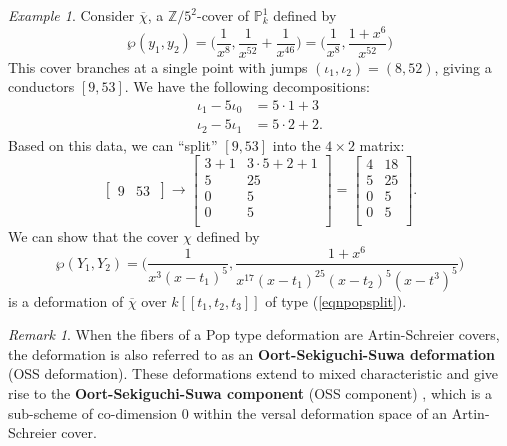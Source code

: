 \documentclass{compositio}
\theoremstyle{remark}
\newtheorem{example}[theorem]{Example}
\theoremstyle{remark}
\newtheorem{remark}[theorem]{Remark}
\begin{document}
\begin{example}
\label{examplepopdeformation}
Consider $\overline{\chi}$, a $\mathbb{Z}/5^2$-cover of $\mathbb{P}^1_k$ defined by
\[ \wp(y_1,y_2)=\bigg( \frac{1}{x^8}, \frac{1}{x^{52}}+\frac{1}{x^{46}} \bigg)=\bigg( \frac{1}{x^8}, \frac{1+x^6}{x^{52}}\bigg) \]
This cover branches at a single point with jumps $(\iota_1, \iota_2)=(8, 52)$, giving a conductors $[9,53]$. We have the following decompositions:
\begin{equation}
\begin{split}
\iota_1-5\iota_0 & = 5 \cdot 1 + 3 \\
\iota_2-5\iota_1 & = 5 \cdot 2+2.
\end{split}
\end{equation}
Based on this data, we can ``split'' $[9,53]$ into the $4 \times 2$ matrix:
\begin{equation}
\label{eqnpopsplit}
\begin{bmatrix}
9 & 53 \
\end{bmatrix} \xrightarrow{} \begin{bmatrix}
3+1 & 3\cdot 5+2+1 \\
5 & 25 \\
0 & 5\\
0 & 5\\
\end{bmatrix}=\begin{bmatrix}
4 & 18 \\
5 & 25 \\
0 & 5\\
0 & 5 \\
\end{bmatrix}.
\end{equation}
We can show that the cover $\chi$ defined by
\[ \wp(Y_1,Y_2)= \bigg(\frac{1}{x^3(x-t_1)^5}, \frac{1+x^6}{x^{17}(x-t_1)^{25}(x-t_2)^{5}(x-t^3)^{5}}  \bigg) \]
is a deformation of $\overline{\chi}$ over $k[[t_1,t_2,t_3]]$ of type (\ref{eqnpopsplit}).
\end{example}


\begin{remark}
When the fibers of a Pop type deformation are Artin-Schreier covers, the deformation is also referred to as an \textbf{Oort-Sekiguchi-Suwa deformation} (OSS deformation). These deformations extend to mixed characteristic and give rise to the \textbf{Oort-Sekiguchi-Suwa component} (OSS component) \cite[\S 4.3]{MR1767273}, which is a sub-scheme of co-dimension $0$ within the versal deformation space of an Artin-Schreier cover.
\end{remark}
\end{document}

